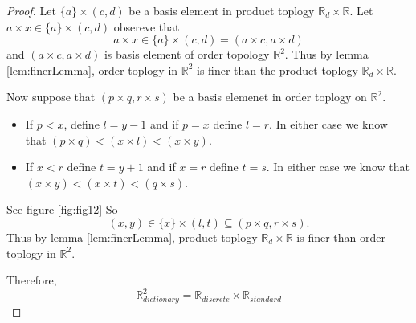 \documentclass[
]{book}
\providecommand{\tightlist}{%
  \setlength{\itemsep}{0pt}\setlength{\parskip}{0pt}}
\theoremstyle{definition}
\theoremstyle{definition}
\theoremstyle{definition}
\theoremstyle{definition}
\theoremstyle{remark}
\begin{document}
\begin{proof}
Let \(\{a\} \times (c,d)\) be a basis element in product toplogy \(\mathbb{R}_d \times \mathbb{R}\). Let \(a\times x\in \{a\} \times (c,d)\) obsereve that
\[a\times x\in \{a\} \times (c,d) = (a\times c,a\times d)\]
and \((a\times c,a\times d)\) is basis element of order topology \(\mathbb{R}^2\). Thus by lemma \ref{lem:finerLemma}, order toplogy in \(\mathbb{R}^2\) is finer than the product toplogy \(\mathbb{R}_d \times \mathbb{R}\).

Now suppose that \((p\times q, r \times s)\) be a basis elemenet in order toplogy on \(\mathbb{R}^2\).

\begin{itemize}
\tightlist
\item
  If \(p<x\), define \(l=y−1\) and if \(p=x\) define \(l=r\). In either case we know that \((p\times q)<(x\times l)<(x\times y)\).
\item
  If \(x<r\) define \(t=y+1\) and if \(x=r\) define \(t=s\). In either case we know that \((x\times y)<(x\times t)<(q \times s)\).
\end{itemize}

See figure \ref{fig:fig12}
So \[(x,y) \in \{x\} \times (l,t) \subseteq (p \times q, r \times s).\]
Thus by lemma \ref{lem:finerLemma}, product toplogy \(\mathbb{R}_d \times \mathbb{R}\) is finer than order toplogy in \(\mathbb{R}^2\).

Therefore, \[\mathbb{R}^2_{dictionary}=\mathbb{R}_{discrete }\times \mathbb{R}_{standard}\]
\end{proof}
\end{document}

